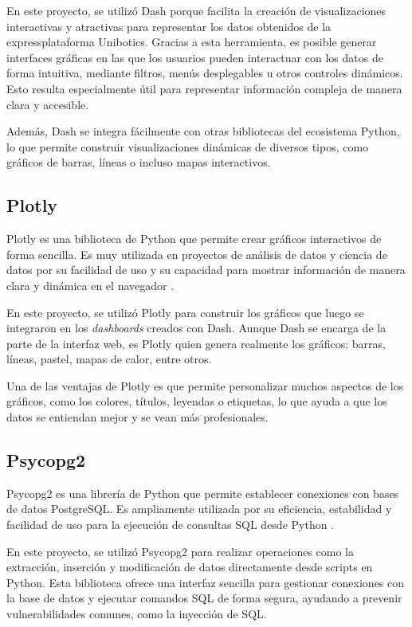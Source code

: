 \documentclass[a4paper, 12pt]{book}
\begin{document}
En este proyecto, se utilizó Dash porque facilita la creación de visualizaciones interactivas y atractivas para representar los datos obtenidos de la expressplataforma Unibotics. Gracias a esta herramienta, es posible generar interfaces gráficas en las que los usuarios pueden interactuar con los datos de forma intuitiva, mediante filtros, menús desplegables u otros controles dinámicos. Esto resulta especialmente útil para representar información compleja de manera clara y accesible.

Además, Dash se integra fácilmente con otras bibliotecas del ecosistema Python, lo que permite construir visualizaciones dinámicas de diversos tipos, como gráficos de barras, líneas o incluso mapas interactivos.

\subsection{Plotly}
\label{subsec:plotly}

Plotly es una biblioteca de Python que permite crear gráficos interactivos de forma sencilla. Es muy utilizada en proyectos de análisis de datos y ciencia de datos por su facilidad de uso y su capacidad para mostrar información de manera clara y dinámica en el navegador \cite{plotlyDocumentation}.

En este proyecto, se utilizó Plotly para construir los gráficos que luego se integraron en los \textit{dashboards} creados con Dash. Aunque Dash se encarga de la parte de la interfaz web, es Plotly quien genera realmente los gráficos: barras, líneas, pastel, mapas de calor, entre otros.

Una de las ventajas de Plotly es que permite personalizar muchos aspectos de los gráficos, como los colores, títulos, leyendas o etiquetas, lo que ayuda a que los datos se entiendan mejor y se vean más profesionales.

\subsection{Psycopg2}
\label{subsec:psycopg2}

Psycopg2 es una librería de Python que permite establecer conexiones con bases de datos PostgreSQL. Es ampliamente utilizada por su eficiencia, estabilidad y facilidad de uso para la ejecución de consultas SQL desde Python \cite{psycopgDocumentation}.

En este proyecto, se utilizó Psycopg2 para realizar operaciones como la extracción, inserción y modificación de datos directamente desde scripts en Python. Esta biblioteca ofrece una interfaz sencilla para gestionar conexiones con la base de datos y ejecutar comandos SQL de forma segura, ayudando a prevenir vulnerabilidades comunes, como la inyección de SQL.
\end{document}
